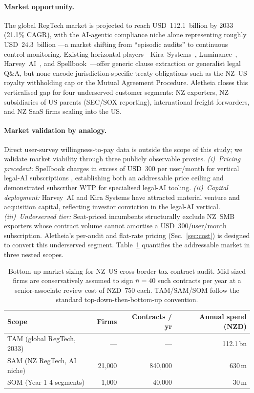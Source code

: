 \documentclass{article}
\begin{document}
\paragraph{Market opportunity.} The global RegTech market is projected
to reach USD~112.1~billion by 2033 (21.1\% CAGR), with the AI-agentic
compliance niche alone representing roughly USD~24.3~billion
\cite{gvr2024regtech}---a market shifting from ``episodic audits'' to
continuous control monitoring. Existing horizontal
players---Kira~Systems~\cite{kira2023}, Luminance~\cite{luminance2022},
Harvey~AI~\cite{harvey2023}, and Spellbook~\cite{spellbook2024}---offer
generic clause extraction or generalist legal Q\&A, but none encode
jurisdiction-specific treaty obligations such as the NZ--US royalty
withholding cap or the Mutual Agreement Procedure. Aletheia closes
this verticalised gap for four underserved customer segments: NZ
exporters, NZ subsidiaries of US parents (SEC/SOX reporting),
international freight forwarders, and NZ SaaS firms scaling into the US.

\paragraph{Market validation by analogy.} Direct user-survey
willingness-to-pay data is outside the scope of this study; we
validate market viability through three publicly observable proxies.
\emph{(i)~Pricing precedent:} Spellbook charges in excess of USD~300
per user/month for vertical legal-AI subscriptions
\cite{spellbook2024}, establishing both an addressable price ceiling
and demonstrated subscriber WTP for specialised legal-AI tooling.
\emph{(ii)~Capital deployment:} Harvey~AI \cite{harvey2023} and Kira
Systems \cite{kira2023} have attracted material venture and acquisition
capital, reflecting investor conviction in the legal-AI vertical.
\emph{(iii)~Underserved tier:} Seat-priced incumbents structurally
exclude NZ~SMB exporters whose contract volume cannot amortise a
USD~300/user/month subscription. Aletheia's per-audit and flat-rate
pricing (Sec.~\ref{sec:cost}) is designed to convert this underserved
segment. Table~\ref{tab:market} quantifies the addressable market in
three nested scopes.

\begin{table}[!ht]
\centering
\caption{Bottom-up market sizing for NZ--US cross-border tax-contract
audit. Mid-sized firms are conservatively assumed to sign
$\bar{n}{=}40$ such contracts per year at a senior-associate review
cost of NZD~750 each. TAM/SAM/SOM follow the standard
top-down-then-bottom-up convention.}
\label{tab:market}
\small
\begin{tabular}{lrrr}
\toprule
\textbf{Scope} & \textbf{Firms} & \textbf{Contracts / yr}
               & \textbf{Annual spend (NZD)} \\
\midrule
TAM (global RegTech, 2033) & ---     & ---       & 112.1\,bn \cite{gvr2024regtech} \\
SAM (NZ RegTech, AI niche) & 21{,}000 & 840{,}000 & 630\,m \\
SOM (Year-1 4 segments)    & 1{,}000 & 40{,}000  & 30\,m \\
\bottomrule
\end{tabular}
\end{table}
\end{document}
